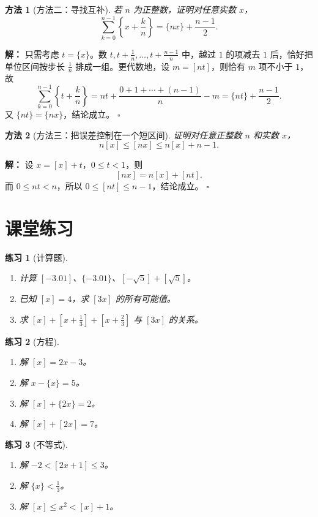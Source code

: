 \documentclass[11pt,a4paper,fontset=fandol]{ctexart}
\theoremstyle{formaltheorem}
\newtheorem{method}{方法}[section]
\theoremstyle{formalexample}
\newtheorem{exercise}{练习}[section]
\newenvironment{solution}{\par\noindent\textbf{解：}}{\hfill$\square$\par}
\begin{document}
\begin{method}[方法二：寻找互补]
若 $n$ 为正整数，证明对任意实数 $x$，
\[
\sum_{k=0}^{n-1}\left\{x+\frac{k}{n}\right\}
=\{nx\}+\frac{n-1}{2}.
\]
\end{method}
\begin{solution}
只需考虑 $t=\{x\}$。数 $t,t+\frac1n,\ldots,t+\frac{n-1}{n}$ 中，越过 $1$ 的项减去 $1$ 后，恰好把单位区间按步长 $\frac1n$ 排成一组。更代数地，设 $m=[nt]$，则恰有 $m$ 项不小于 $1$，故
\[
\sum_{k=0}^{n-1}\left\{t+\frac{k}{n}\right\}
=nt+\frac{0+1+\cdots+(n-1)}n-m
=\{nt\}+\frac{n-1}{2}.
\]
又 $\{nt\}=\{nx\}$，结论成立。
\end{solution}

\begin{method}[方法三：把误差控制在一个短区间]
证明对任意正整数 $n$ 和实数 $x$，
\[
n[x]\le[nx]\le n[x]+n-1.
\]
\end{method}
\begin{solution}
设 $x=[x]+t$，$0\le t<1$，则
\[
[nx]=n[x]+[nt].
\]
而 $0\le nt<n$，所以 $0\le[nt]\le n-1$，结论成立。
\end{solution}

\section{课堂练习}
\begin{exercise}[计算题]
\begin{enumerate}
  \item 计算 $[-3.01]$、$\{-3.01\}$、$[-\sqrt5]+[\sqrt5]$。
  \item 已知 $[x]=4$，求 $[3x]$ 的所有可能值。
  \item 求 $[x]+[x+\frac13]+[x+\frac23]$ 与 $[3x]$ 的关系。
\end{enumerate}
\end{exercise}

\begin{exercise}[方程]
\begin{enumerate}
  \item 解 $[x]=2x-3$。
  \item 解 $x-\{x\}=5$。
  \item 解 $[x]+\{2x\}=2$。
  \item 解 $[x]+[2x]=7$。
\end{enumerate}
\end{exercise}

\begin{exercise}[不等式]
\begin{enumerate}
  \item 解 $-2<[2x+1]\le3$。
  \item 解 $\{x\}<\frac13$。
  \item 解 $[x]\le x^2<[x]+1$。
\end{enumerate}
\end{exercise}
\end{document}
